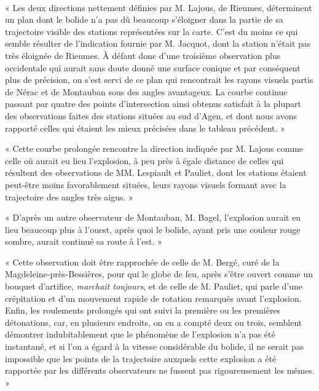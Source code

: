 \documentclass[a4paper, 11pt, oneside, polutonikogreek, french]{article}
\begin{document}
\paragraph{}
« Les deux directions nettement définies par M. Lajous, de Rieumes, déterminent un plan dont le bolide n'a pas dû beaucoup s'éloigner dans la partie de sa trajectoire visible des stations représentées sur la carte. C'est du moins ce qui semble résulter de l'indication fournie par M. Jacquot, dont la station n'était pas très éloignée de Rieumes. À défaut donc d'une troisième observation plus occidentale qui aurait sans doute donné une surface conique et par conséquent plus de précision, on s'est servi de ce plan qui rencontrait les rayons visuels partis de Nérac et de Montauban sous des angles avantageux. La courbe continue passant par quatre des points d'intersection ainsi obtenus satisfait à la plupart des observations faites des stations situées au sud d'Agen, et dont nous avons rapporté celles qui étaient les mieux précisées dans le tableau précédent. »

« Cette courbe prolongée rencontre la direction indiquée par M. Lajous comme celle où aurait eu lieu l'explosion, à peu près à égale distance de celles qui résultent des observations de MM. Lespiault et Pauliet, dont les stations étaient peut-être moins favorablement situées, leurs rayons visuels formant avec la trajectoire des angles très aigus. »

« D'après un autre observateur de Montauban, M. Bagel, l'explosion aurait eu lieu beaucoup plus à l'ouest, après quoi le bolide, ayant pris une couleur rouge sombre, aurait continué sa route à l'est. »

« Cette observation doit être rapprochée de celle de M. Bergé, curé de la Magdeleine-près-Bessières, pour qui le globe de feu, après s'être ouvert comme un bouquet d'artifice, \emph{marchait toujours}, et de celle de M. Pauliet, qui parle d'une crépitation et d'un mouvement rapide de rotation remarqués avant l'explosion. Enfin, les roulements prolongés qui ont suivi la première ou les premières détonations, car, en plusieurs endroits, on en a compté deux ou trois, semblent démontrer indubitablement que le phénomène de l'explosion n'a pas été instantané, et si l'on a égard à la vitesse considérable du bolide, il ne serait pas impossible que les points de la trajectoire auxquels cette explosion a été rapportée par les différents observateurs ne fussent pas rigoureusement les mêmes. »
\end{document}
